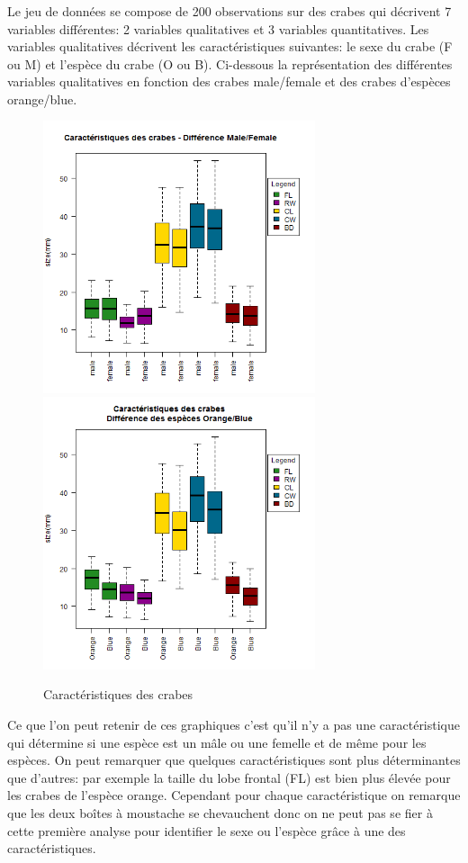 \documentclass[titlepage]{article}
\begin{document}
\subsubsection{}
Le jeu de données se compose de 200 observations sur des crabes qui décrivent 7 variables différentes: 2 variables qualitatives et 3 variables quantitatives. Les variables qualitatives décrivent les caractéristiques suivantes: le sexe du crabe (F ou M) et l'espèce du crabe (O ou B). Ci-dessous la représentation des différentes variables qualitatives en fonction des crabes male/female et des crabes d'espèces orange/blue.
\begin{figure}[H]
\label{fig2}
\begin{center}
\includegraphics[width=8cm]{caracteristiquesMF.png}
\includegraphics[width=8cm]{caracteristiquesOB.png}
\end{center}
\caption{Caractéristiques des crabes}
\end{figure}
Ce que l'on peut retenir de ces graphiques c'est qu'il n'y a pas une caractéristique qui détermine si une espèce est un mâle ou une femelle et de même pour les espèces. On peut remarquer que quelques caractéristiques sont plus déterminantes que d'autres: par exemple la taille du lobe frontal (FL) est bien plus élevée pour les crabes de l'espèce orange. Cependant pour chaque caractéristique on remarque que les deux boîtes à moustache se chevauchent donc on ne peut pas se fier à cette première analyse pour identifier le sexe ou l'espèce grâce à une des caractéristiques.
\end{document}
